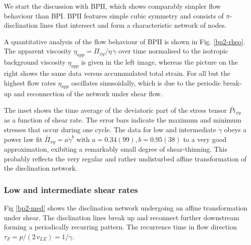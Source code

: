 \documentclass[aps,pre,reprint,superscriptaddress, twocolumn]{revtex4}
\newcommand{\gd}{\dot{\gamma}}
\begin{document}
We start the discussion with BPII, which shows comparably simpler flow behaviour than BPI.
BPII features simple cubic symmetry and consists of $\pi$-disclination lines that 
intersect and form a characteristic network of nodes.

A quantitative analysis of the flow behaviour of BPII is shown in Fig. \ref{bp2-rheo}.
The apparent viscosity $\eta_{app}=\Pi_{xy}/\eta\,\gd$ over time normalised to
the isotropic background viscosity $\eta_{app}$ is given in the left image, whereas
the picture on the right shows the same data versus accummulated total strain.
For all but the highest flow rates $\eta_{app}$ oscillates sinusoidally, which
is due to the periodic break-up and reconnection of the network under shear flow.

The inset shows the time average of the deviatoric part of the stress tensor $\bar{Pi}_{xy}$ as a function of shear rate.
The error bars indicate the maximum and minimum stresses that occur during one cycle.
The data for low and intermediate $\gd$ obeys a power law fit $\bar{\Pi}_{xy}=a \gd^b$ with $a=0.34(99), b=0.95(38)$ to
a very good approximation, exibiting a remarkably small degree of shear-thinning.
This probably reflects the very regular and rather undisturbed affine transformation of the disclination network.  


\subsubsection{Low and intermediate shear rates}


Fig \ref{bp2-med} shows the disclination network 
undergoing an affine transformation under shear. The disclination lines break up and 
reconnect further downstream forming a periodically recurring pattern. 
The recurrence time in flow direction $\tau_F=p/(2\, v_{LE})= 1/\gd$.
\end{document}
